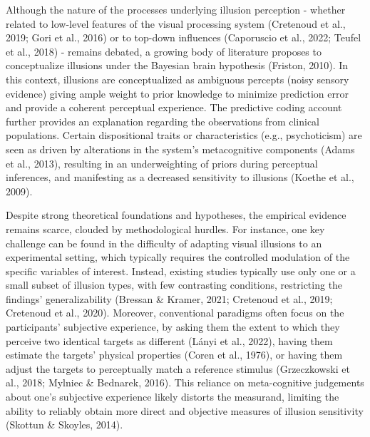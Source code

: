 \documentclass[
  man,floatsintext]{apa6}
\begin{document}
Although the nature of the processes underlying illusion perception - whether related to low-level features of the visual processing system (Cretenoud et al., 2019; Gori et al., 2016) or to top-down influences (Caporuscio et al., 2022; Teufel et al., 2018) - remains debated, a growing body of literature proposes to conceptualize illusions under the Bayesian brain hypothesis (Friston, 2010). In this context, illusions are conceptualized as ambiguous percepts (noisy sensory evidence) giving ample weight to prior knowledge to minimize prediction error and provide a coherent perceptual experience. The predictive coding account further provides an explanation regarding the observations from clinical populations. Certain dispositional traits or characteristics (e.g., psychoticism) are seen as driven by alterations in the system's metacognitive components (Adams et al., 2013), resulting in an underweighting of priors during perceptual inferences, and manifesting as a decreased sensitivity to illusions (Koethe et al., 2009).

Despite strong theoretical foundations and hypotheses, the empirical evidence remains scarce, clouded by methodological hurdles. For instance, one key challenge can be found in the difficulty of adapting visual illusions to an experimental setting, which typically requires the controlled modulation of the specific variables of interest. Instead, existing studies typically use only one or a small subset of illusion types, with few contrasting conditions, restricting the findings' generalizability (Bressan \& Kramer, 2021; Cretenoud et al., 2019; Cretenoud et al., 2020). Moreover, conventional paradigms often focus on the participants' subjective experience, by asking them the extent to which they perceive two identical targets as different (Lányi et al., 2022), having them estimate the targets' physical properties (Coren et al., 1976), or having them adjust the targets to perceptually match a reference stimulus (Grzeczkowski et al., 2018; Mylniec \& Bednarek, 2016). This reliance on meta-cognitive judgements about one's subjective experience likely distorts the measurand, limiting the ability to reliably obtain more direct and objective measures of illusion sensitivity (Skottun \& Skoyles, 2014).
\end{document}
